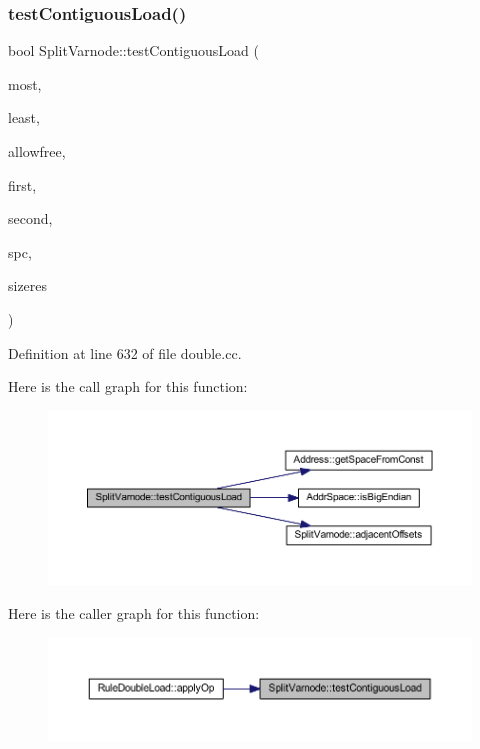 \subsubsection{\texorpdfstring{testContiguousLoad()}{testContiguousLoad()}}
{\footnotesize\ttfamily bool Split\+Varnode\+::test\+Contiguous\+Load (\begin{DoxyParamCaption}\item[{\mbox{\hyperlink{class_pcode_op}{Pcode\+Op}} $\ast$}]{most,  }\item[{\mbox{\hyperlink{class_pcode_op}{Pcode\+Op}} $\ast$}]{least,  }\item[{bool}]{allowfree,  }\item[{\mbox{\hyperlink{class_pcode_op}{Pcode\+Op}} $\ast$\&}]{first,  }\item[{\mbox{\hyperlink{class_pcode_op}{Pcode\+Op}} $\ast$\&}]{second,  }\item[{\mbox{\hyperlink{class_addr_space}{Addr\+Space}} $\ast$\&}]{spc,  }\item[{int4 \&}]{sizeres }\end{DoxyParamCaption})\hspace{0.3cm}{\ttfamily [static]}}



Definition at line 632 of file double.\+cc.

Here is the call graph for this function\+:
\nopagebreak
\begin{figure}[H]
\begin{center}
\leavevmode
\includegraphics[width=350pt]{class_split_varnode_a633feccdecafe2850128bbc8e530f24b_cgraph}
\end{center}
\end{figure}
Here is the caller graph for this function\+:
\nopagebreak
\begin{figure}[H]
\begin{center}
\leavevmode
\includegraphics[width=350pt]{class_split_varnode_a633feccdecafe2850128bbc8e530f24b_icgraph}
\end{center}
\end{figure}
\mbox{\label{class_split_varnode_a7f475a7c1f0b3e3d2d11dba2f52d5572}} 
